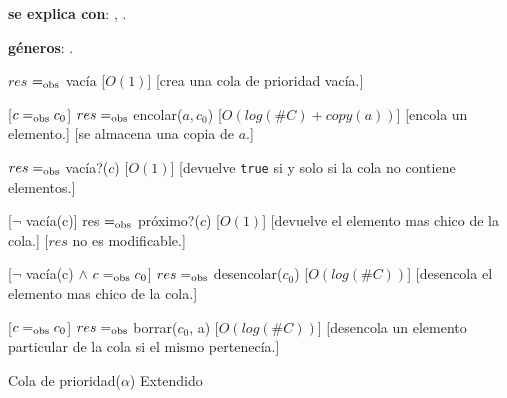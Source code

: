 \begin{Interfaz}

	\textbf{se explica con}: , .

	\textbf{géneros}: .


	{$res$ $=_{\mathrm{obs}}$ vacía}
	[$O(1)$]
	[crea una cola de prioridad vacía.]

	[$c =_{\mathrm{obs}} c_0$]
	{$res =_{\mathrm{obs}}$ encolar($a, c_0$)}
	[$O(log(\#C) + copy(a))$]
	[encola un elemento.]
	[se almacena una copia de $a$.]

	{$res =_{\mathrm{obs}}$ vacía?($c$)}
	[$O(1)$]
	[devuelve \texttt{true} si y solo si la cola no contiene elementos.]

	[$\neg$ vacía(c)]
	{res $=_{\mathrm{obs}}$ próximo?($c$)}
	[$O(1)$]
	[devuelve el elemento mas chico de la cola.]
	[$res$ no es modificable.]

	[$\neg$ vacía(c) $\land$ $c =_{\mathrm{obs}} c_0$]
	{$res =_{\mathrm{obs}}$ desencolar($c_0$)}
	[$O(log(\#C))$]
	[desencola el elemento mas chico de la cola.]

	[$c =_{\mathrm{obs}} c_0$]
	{$res =_{\mathrm{obs}}$ borrar($c_0$, a)}
	[$O(log(\#C))$]
	[desencola un elemento particular de la cola si el mismo pertenecía.]


  \begin{tad}{Cola de prioridad($\alpha$) Extendido}
    \parskip=0pt
    
    \tadAxiomas
  \end{tad}
\end{Interfaz}

